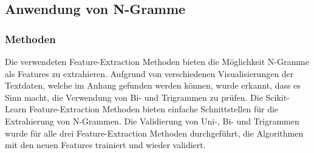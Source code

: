 \subsection{Anwendung von N-Gramme}
\subsubsection{Methoden}
Die verwendeten Feature-Extraction Methoden bieten die Möglichkeit N-Gramme als Features zu extrahieren.
Aufgrund von verschiedenen Visualisierungen der Textdaten, welche im Anhang gefunden werden können, wurde erkannt, dass es Sinn macht, die Verwendung von Bi- und Trigrammen zu prüfen.
Die Scikit-Learn Feature-Extraction Methoden bieten einfache Schnittstellen für die Extrahierung von N-Grammen.
Die Validierung von Uni-, Bi- und Trigrammen wurde für alle drei Feature-Extraction Methoden durchgeführt, die Algorithmen mit den neuen Features trainiert und wieder validiert.
